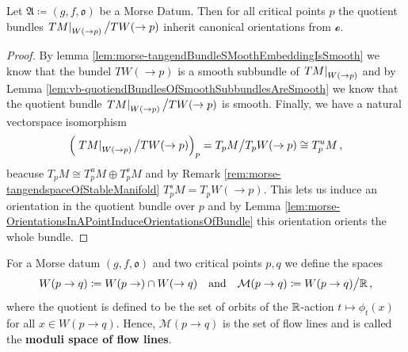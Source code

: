 \begin{proposition}\label{prop:morse-orientTheQuotient}
	Let $\mathfrak{A}\coloneq (g,f,\mathfrak{o})$ be a Morse Datum. Then for all critical points $p$ the quotient bundles $\left.TM\right|_{W(\to p)}\big/ TW(\to p)$ inherit canonical orientations from $\mathcal{o}$.
\end{proposition}
\begin{proof}
	By lemma \ref{lem:morse-tangendBundleSMoothEmbeddingIsSmooth} we know that the bundel $TW(\to p)$ is a smooth subbundle of $\left.TM\right|_{W(\to p)}$ and by Lemma \ref{lem:vb-quotiendBundlesOfSmoothSubbundlesAreSmooth} we know that the quotient bundle $\left.TM\right|_{W(\to p)}\big/ TW(\to p)$ is smooth. Finally, we have a natural vectorspace isomorphism 
	\begin{equation*}
	\Big(\left.TM\right|_{W(\to p)}\big/ TW(\to p)\Big)_p={T_pM}\big/ T_pW(\to p)\cong T^u_pM\,,
	\end{equation*} beacuse $T_pM\cong T^u_pM\oplus T^s_pM$ and by Remark \ref{rem:morse-tangendspaceOfStableManifold} $ T^s_pM= T_pW(\to p)$. This lets us induce an orientation in the quotient bundle over $p$ and by Lemma \ref{lem:morse-OrientationsInAPointInduceOrientationsOfBundle} this orientation orients the whole bundle.
\end{proof}
\begin{definition}\label{def:morse-moduliSpaceOfFlowLines}
	For a Morse datum $(g,f,\mathfrak{o})$ and two critical points $p,q$ we define the spaces
	\begin{equation*}
		W(p\to q)\coloneq W(p\to) \cap W(\to q)\quad \text{and}\quad
		\mathcal{M}(p\to q)\coloneq W(p\to q)\big/ \mathbb{R}\,,
	\end{equation*} where the quotient is defined to be the set of orbits of the $\mathbb{R}$-action $t \mapsto \phi_t(x) $ for all $x\in W(p\to q)$. Hence, $\mathcal{M}(p\to q)$ is the set of flow lines and is called the \textbf{moduli space of flow lines}.
\end{definition}
